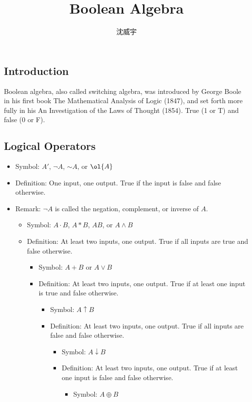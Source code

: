 \documentclass[a4paper,12pt]{article}
\begin{document}
\title{Boolean Algebra}
\author{沈威宇}
\date{\temtoday}
\titletocdoc
{}
\subsection{Introduction}
Boolean algebra, also called switching algebra, was introduced by George Boole in his first book The Mathematical Analysis of Logic (1847), and set forth more fully in his An Investigation of the Laws of Thought (1854).
True (1 or T) and false (0 or F).
\subsection{Logical Operators}
\begin{itemize}
\item Symbol: $A'$, $\neg A$, $\mathord{\sim}A$, or $\ol{A}$
\item Definition: One input, one output. True if the input is false and false otherwise.
\item Remark: $\neg A$ is called the negation, complement, or inverse of $A$.
\eit 
{}
\begin{itemize}
\item Symbol: $A \cdot B$, $A*B$, $AB$, or $A\land B$
\item Definition: At least two inputs, one output. True if all inputs are true and false otherwise.
\eit
{}
\begin{itemize}
\item Symbol: $A + B$ or $A\lor B$
\item Definition: At least two inputs, one output. True if at least one input is true and false otherwise.
\eit
{}
\begin{itemize}
\item Symbol: $A\uparrow B$
\item Definition: At least two inputs, one output. True if all inputs are false and false otherwise.
\eit
{}
\begin{itemize}
\item Symbol: $A\downarrow B$
\item Definition: At least two inputs, one output. True if at least one input is false and false otherwise.
\eit
{}
\begin{itemize}
\item Symbol: $A \oplus B$

\end{itemize}
\end{itemize}
\end{itemize}
\end{itemize}
\end{itemize}
\end{itemize}
\end{document}
